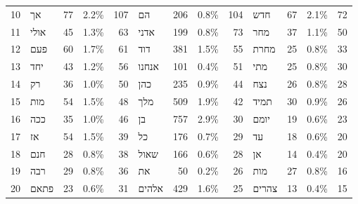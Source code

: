 \begin{table}[htbp!]
\begin{adjustbox}{width=1\textwidth}
\begin{tabular}{llrlrlrlrlrlr}
10   &    \texthebrew{אך} &     77 &   2.2\% &     107 &     \texthebrew{הם} &    206 &  0.8\% &     104 &    \texthebrew{חדש} &     67 &   2.1\% &      72 \\
11   &  \texthebrew{אולי} &     45 &   1.3\% &      63 &   \texthebrew{אדני} &    199 &  0.8\% &      73 &    \texthebrew{מחר} &     37 &   1.1\% &      50 \\
12   &   \texthebrew{פעם} &     60 &   1.7\% &      61 &    \texthebrew{דוד} &    381 &  1.5\% &      55 &   \texthebrew{מחרת} &     25 &   0.8\% &      33 \\
13   &   \texthebrew{יחד} &     43 &   1.2\% &      56 &  \texthebrew{אנחנו} &    101 &  0.4\% &      51 &    \texthebrew{מתי} &     25 &   0.8\% &      30 \\
14   &    \texthebrew{רק} &     36 &   1.0\% &      50 &    \texthebrew{כהן} &    235 &  0.9\% &      44 &    \texthebrew{נצח} &     26 &   0.8\% &      28 \\
15   &   \texthebrew{מות} &     54 &   1.5\% &      48 &    \texthebrew{מלך} &    509 &  1.9\% &      42 &   \texthebrew{תמיד} &     30 &   0.9\% &      26 \\
16   &   \texthebrew{ככה} &     35 &   1.0\% &      46 &     \texthebrew{בן} &    757 &  2.9\% &      30 &   \texthebrew{יומם} &     19 &   0.6\% &      23 \\
17   &    \texthebrew{אז} &     54 &   1.5\% &      39 &     \texthebrew{כל} &    176 &  0.7\% &      29 &     \texthebrew{עד} &     18 &   0.6\% &      20 \\
18   &   \texthebrew{חנם} &     28 &   0.8\% &      38 &   \texthebrew{שאול} &    166 &  0.6\% &      28 &     \texthebrew{אן} &     14 &   0.4\% &      20 \\
19   &   \texthebrew{רבה} &     29 &   0.8\% &      36 &     \texthebrew{את} &     50 &  0.2\% &      26 &    \texthebrew{מות} &     27 &   0.8\% &      16 \\
20   &  \texthebrew{פתאם} &     23 &   0.6\% &      31 &  \texthebrew{אלהים} &    429 &  1.6\% &      25 &  \texthebrew{צהרים} &     13 &   0.4\% &      15 \\
\bottomrule
\end{tabular}
\end{adjustbox}
\end{table}
